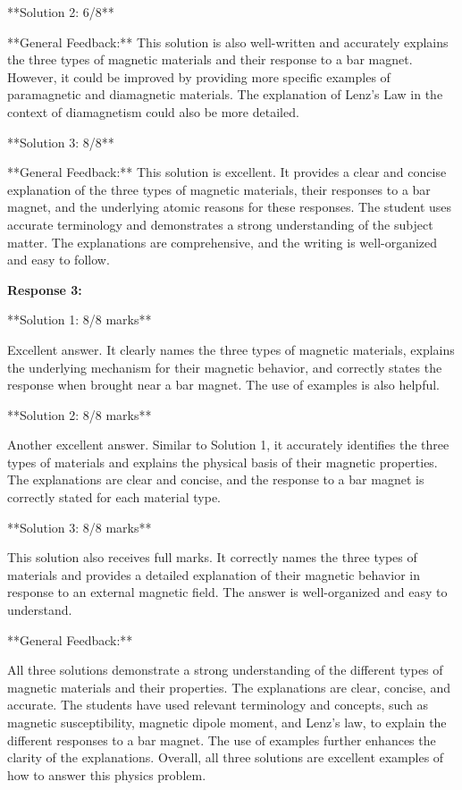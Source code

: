 \documentclass[a4paper,11pt]{article}
\begin{document}
**Solution 2: 6/8**

**General Feedback:** This solution is also well-written and accurately explains the three types of magnetic materials and their response to a bar magnet. However, it could be improved by providing more specific examples of paramagnetic and diamagnetic materials. The explanation of Lenz's Law in the context of diamagnetism could also be more detailed.

**Solution 3: 8/8**

**General Feedback:** This solution is excellent. It provides a clear and concise explanation of the three types of magnetic materials, their responses to a bar magnet, and the underlying atomic reasons for these responses. The student uses accurate terminology and demonstrates a strong understanding of the subject matter. The explanations are comprehensive, and the writing is well-organized and easy to follow. 


\textbf{Response 3:}

**Solution 1: 8/8 marks**

Excellent answer. It clearly names the three types of magnetic materials, explains the underlying mechanism for their magnetic behavior, and correctly states the response when brought near a bar magnet. The use of examples is also helpful.

**Solution 2: 8/8 marks**

Another excellent answer. Similar to Solution 1, it accurately identifies the three types of materials and explains the physical basis of their magnetic properties. The explanations are clear and concise, and the response to a bar magnet is correctly stated for each material type.

**Solution 3: 8/8 marks**

This solution also receives full marks. It correctly names the three types of materials and provides a detailed explanation of their magnetic behavior in response to an external magnetic field. The answer is well-organized and easy to understand.

**General Feedback:**

All three solutions demonstrate a strong understanding of the different types of magnetic materials and their properties. The explanations are clear, concise, and accurate. The students have used relevant terminology and concepts, such as magnetic susceptibility, magnetic dipole moment, and Lenz's law, to explain the different responses to a bar magnet. The use of examples further enhances the clarity of the explanations. Overall, all three solutions are excellent examples of how to answer this physics problem.
\end{document}
